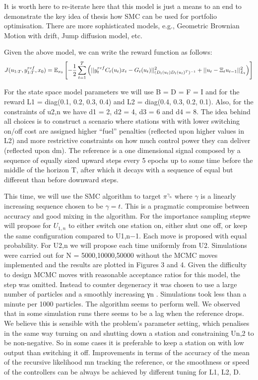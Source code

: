 It is worth here to re-iterate here that this model is just a means to an end to demonstrate the key idea of thesis how SMC can be used for portfolio optimisation. There are more sophisticated models, e.g., Geometric Brownian Motion with drift, Jump diffusion model, etc.

Given the above model, we can write the reward function as follows:
\begin{equation}
  J(u_{1:T},y^{ref}_{1:T}, x_0) = \operatorname{\mathbb{E}}_{x_0}\left[ -\dfrac{1}{2}\displaystyle\sum^T_{t=1}\left(\vert\vert y^{ref}_t C_t(u_t)x_t - G_t(u_t) \vert\vert^2_{(D_t(u_t)D_t(u_t)^T)^{-1}}  + \vert\vert u_t - \Xi_t u_{t-1} \vert\vert^2_{L_t}\right) \right]
\end{equation}

For the state space model parameters we will use B = D = F = I and for the reward L1 = diag(0.1, 0.2, 0.3, 0.4) and L2 = diag(0.4, 0.3, 0.2, 0.1). Also, for the constraints of u2,n we have d1 = 2, d2 = 4, d3 = 6 and d4 = 8. The idea behind all choices is to construct a scenario where stations with with lower switching on/off cost are assigned higher “fuel” penalties (reflected upon higher values in L2) and more restrictive constraints on how much control power they can deliver (reflected upon dm). The reference is a one dimensional signal composed by a sequence of equally sized upward steps every 5 epochs up to some time before the middle of the horizon T, after which it decays with a sequence of equal but different than before downward steps.

This time, we will use the SMC algorithm to target $\pi^{\gamma_n}$ where $\gamma$ is a linearly increasing sequence chosen to be $\gamma=t$. This is a pragmatic compromise between accuracy and good mixing in the algorithm. For the importance sampling stepwe will propose for $U_{1,n}$ to either switch one station on, either shut one off, or keep the same configuration compared to U1,n−1. Each move is proposed with equal probability. For U2,n we will propose each time uniformly from U2. Simulations were carried out for N = 5000,10000,50000 without the MCMC moves implemented and the results are plotted in Figures 3 and 4. Given the difficulty to design MCMC moves with reasonable acceptance ratios for this model, the step was omitted. Instead to counter degeneracy it was chosen to use a large number of particles and a smoothly increasing γn . Simulations took less than a minute per 1000 particles.
The algorithm seems to perform well. We observed that in some simulation runs there seems to be a lag when the reference drops. We believe this is sensible with the problem’s parameter setting, which penalises in the same way turning on and shutting down a station and constraining Un,2 to be non-negative. So in some cases it is preferable to keep a station on with low output than switching it off. Improvements in terms of the accuracy of the mean of the recursive likelihood mn tracking the reference, or the smoothness or speed of the controllers can be always be achieved by different tuning for L1, L2, D.

